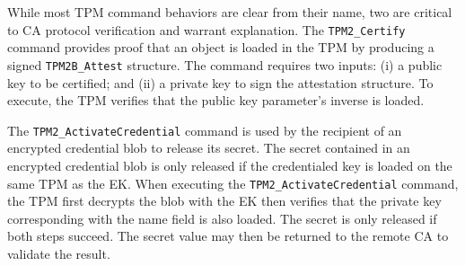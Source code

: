 \documentclass[runningheads]{llncs}
\begin{document}

While most TPM command behaviors are clear from their name, two are
critical to CA protocol verification and warrant explanation.  The
\verb|TPM2_Certify| command provides proof that an object is loaded in
the TPM by producing a signed \verb|TPM2B_Attest| structure. The
command requires two inputs: (i) a public key to be certified; and
(ii) a private key to sign the attestation structure. To execute, the
TPM verifies that the public key parameter's inverse is loaded.



The \verb|TPM2_ActivateCredential| command is used by the recipient of
an encrypted credential blob to release its secret.  The secret
contained in an encrypted credential blob is only released if the
credentialed key is loaded on the same TPM as the EK.  When executing
the \verb|TPM2_ActivateCredential| command, the TPM first decrypts the
blob with the EK then verifies that the private key corresponding with
the name field is also loaded. The secret is only released if both
steps succeed. The secret value may then be returned to the remote CA
to validate the result.

\end{document}
